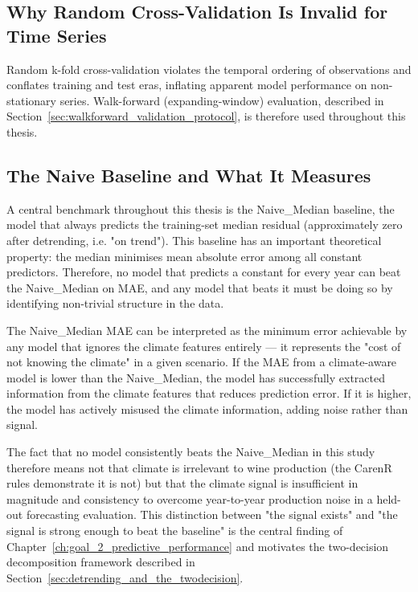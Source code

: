 \subsection{Why Random Cross-Validation Is Invalid for Time Series}\label{sub:why_random_crossvalidation_is}

Random k-fold cross-validation violates the temporal ordering of observations and conflates training and test eras, inflating apparent model performance on non-stationary series. Walk-forward (expanding-window) evaluation, described in Section~\ref{sec:walkforward_validation_protocol}, is therefore used throughout this thesis.


\subsection{The Naive Baseline and What It Measures}\label{sub:the_naive_baseline_and}

A central benchmark throughout this thesis is the Naive\_Median baseline, the model that always predicts the training-set median residual (approximately zero after detrending, i.e. "on trend"). This baseline has an important theoretical property: the median minimises mean absolute error among all constant predictors. Therefore, no model that predicts a constant for every year can beat the Naive\_Median on MAE, and any model that beats it must be doing so by identifying non-trivial structure in the data.

The Naive\_Median MAE can be interpreted as the minimum error achievable by any model that ignores the climate features entirely --- it represents the "cost of not knowing the climate" in a given scenario. If the MAE from a climate-aware model is lower than the Naive\_Median, the model has successfully extracted information from the climate features that reduces prediction error. If it is higher, the model has actively misused the climate information, adding noise rather than signal.

The fact that no model consistently beats the Naive\_Median in this study therefore means not that climate is irrelevant to wine production (the CarenR rules demonstrate it is not) but that the climate signal is insufficient in magnitude and consistency to overcome year-to-year production noise in a held-out forecasting evaluation. This distinction between "the signal exists" and "the signal is strong enough to beat the baseline" is the central finding of Chapter~\ref{ch:goal_2_predictive_performance} and motivates the two-decision decomposition framework described in Section~\ref{sec:detrending_and_the_twodecision}.

